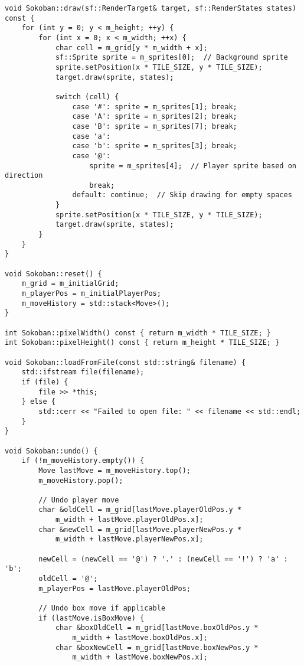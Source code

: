\documentclass[12pt]{article}
\begin{document}
\begin{lstlisting}[style=cppcode]
void Sokoban::draw(sf::RenderTarget& target, sf::RenderStates states) const {
    for (int y = 0; y < m_height; ++y) {
        for (int x = 0; x < m_width; ++x) {
            char cell = m_grid[y * m_width + x];
            sf::Sprite sprite = m_sprites[0];  // Background sprite
            sprite.setPosition(x * TILE_SIZE, y * TILE_SIZE);
            target.draw(sprite, states);

            switch (cell) {
                case '#': sprite = m_sprites[1]; break;
                case 'A': sprite = m_sprites[2]; break;
                case 'B': sprite = m_sprites[7]; break;
                case 'a':
                case 'b': sprite = m_sprites[3]; break;
                case '@':
                    sprite = m_sprites[4];  // Player sprite based on direction
                    break;
                default: continue;  // Skip drawing for empty spaces
            }
            sprite.setPosition(x * TILE_SIZE, y * TILE_SIZE);
            target.draw(sprite, states);
        }
    }
}

void Sokoban::reset() {
    m_grid = m_initialGrid;
    m_playerPos = m_initialPlayerPos;
    m_moveHistory = std::stack<Move>();
}

int Sokoban::pixelWidth() const { return m_width * TILE_SIZE; }
int Sokoban::pixelHeight() const { return m_height * TILE_SIZE; }

void Sokoban::loadFromFile(const std::string& filename) {
    std::ifstream file(filename);
    if (file) {
        file >> *this;
    } else {
        std::cerr << "Failed to open file: " << filename << std::endl;
    }
}

void Sokoban::undo() {
    if (!m_moveHistory.empty()) {
        Move lastMove = m_moveHistory.top();
        m_moveHistory.pop();

        // Undo player move
        char &oldCell = m_grid[lastMove.playerOldPos.y *
            m_width + lastMove.playerOldPos.x];
        char &newCell = m_grid[lastMove.playerNewPos.y *
            m_width + lastMove.playerNewPos.x];

        newCell = (newCell == '@') ? '.' : (newCell == '!') ? 'a' : 'b';
        oldCell = '@';
        m_playerPos = lastMove.playerOldPos;

        // Undo box move if applicable
        if (lastMove.isBoxMove) {
            char &boxOldCell = m_grid[lastMove.boxOldPos.y *
                m_width + lastMove.boxOldPos.x];
            char &boxNewCell = m_grid[lastMove.boxNewPos.y *
                m_width + lastMove.boxNewPos.x];


\end{lstlisting}
\end{document}
